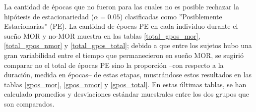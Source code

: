 La cantidad de \'epocas que no fueron para las cuales no es posible rechazar la hip\'otesis de
estacionariedad ($\alpha=0.05$)
clasificadas como ''Posiblemente Estacionarias'' (PE). 
La cantidad de \'epocas PE en cada individuo %
durante el sue\~no MOR y no-MOR
muestra en las tablas \ref{total_gpos_mor}, \ref{total_gpos_nmor} y
\ref{total_gpos_total}; debido a que entre los sujetos hubo una gran variabilidad entre el tiempo 
que permanecieron en sue\~no MOR, se sugiri\'o comparar no el total de \'epocas PE sino
la proporci\'on --con respecto a la duraci\'on, medida en \'epocas-- de estas etapas, 
mustr\'andose estos resultados en las tablas \ref{gpos_mor}, \ref{gpos_nmor} y
\ref{gpos_total}. En estas \'ultimas tablas, se han calculado promedios y desviaciones
est\'andar muestrales entre los dos grupos que son comparados.

